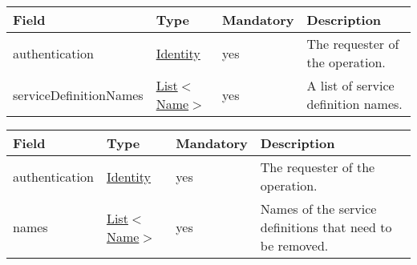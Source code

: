 \documentclass[a4paper]{arrowhead}
\newcommand{\pref}[1]{{\textcolor{ArrowheadGrey}{\hyperref[sec:model:primitives:#1]{#1}}}}
\begin{document}
\label{sec:model:ServiceDefinitionListRequest}
 
\begin{table}[ht!]
\begin{tabularx}{\textwidth}{| p{3.7cm} | p{2.5cm} | p{2cm} | X |} \hline
\rowcolor{gray!33} Field & Type & Mandatory & Description \\ \hline
authentication & \hyperref[sec:model:Identity]{Identity} & yes & The requester of the operation. \\ \hline
serviceDefinitionNames & \pref{List}$<$\pref{Name}$>$ & yes & A list of service definition names. \\ \hline
\end{tabularx}
\end{table}

\label{sec:model:ServiceDefinitionRemoveRequest}

\begin{table}[ht!]
\begin{tabularx}{\textwidth}{| p{2.5cm} | p{2.5cm} | p{2cm} | X |} \hline
\rowcolor{gray!33} Field & Type & Mandatory & Description \\ \hline
authentication & \hyperref[sec:model:Identity]{Identity} & yes & The requester of the operation. \\ \hline
names &  \pref{List}$<$\pref{Name}$>$ & yes & Names of the service definitions that need to be removed. \\ \hline
\end{tabularx}
\end{table}

\label{sec:model:ServiceQueryRequest}
\end{document}

